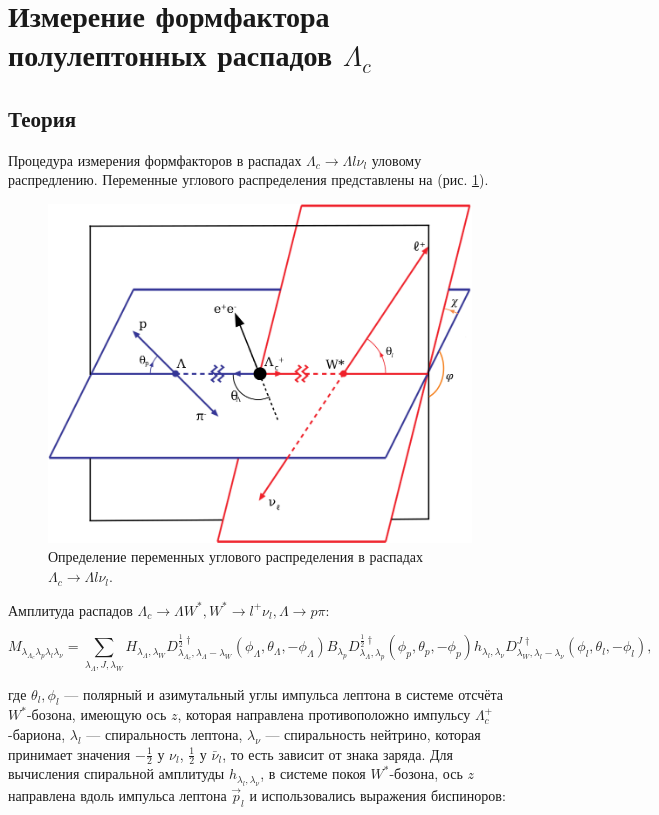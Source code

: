 \section{Измерение формфактора полулептонных распадов $\Lambda_c$}

\subsection{Теория}

Процедура измерения формфакторов в распадах $\Lambda_c \to \Lambda l \nu_l$
уловому распредлению. Переменные углового распределения представлены 
на (рис. \ref{lc_l_l_nu:def}). 

\begin{figure}[H]
    \centering
    \includegraphics[width=0.7\linewidth]{img/lc_l_l_nu_def.png}
    \caption{Определение переменных углового распределения в распадах  $\Lambda_c \to \Lambda l \nu_l$.}
    \label{lc_l_l_nu:def}
\end{figure}

Амплитуда распадов 
$\Lambda_c \to \Lambda W^*, W^* \to l^+ \nu_l, \Lambda \to p \pi$:


\begin{equation}
    M_{\lambda_{\Lambda_c}\lambda_{p}\lambda_{l}\lambda_{\nu}} 
    = 
    \sum_{\lambda_{\Lambda},J,\lambda_{W}} H_{\lambda_{\Lambda},\lambda_{W}} D^{\frac{1}{2} \dagger}_{\lambda_{\Lambda_c},\lambda_{\Lambda}-\lambda_{W}}(\phi_{\Lambda}, \theta_{\Lambda}, -\phi_{\Lambda}) B_{\lambda_{p}} D^{\frac{1}{2} \dagger}_{\lambda_{\Lambda},\lambda_{p}}(\phi_{p}, \theta_{p}, -\phi_{p}) h_{\lambda_{l},\lambda_{\nu}} D^{J \dagger}_{\lambda_{W},\lambda_{l}-\lambda_{\nu}}(\phi_{l}, \theta_{l}, -\phi_{l}),
\end{equation}


где $\theta_l, \phi_l$ --- полярный и азимутальный углы импульса лептона 
в системе отсчёта  $W^*$-бозона, имеющую ось $z$, которая направлена 
противоположно импульсу $\Lambda^+_c $-бариона, 
$\lambda_l$ --- спиральность лептона, 
$\lambda_\nu$ --- спиральность нейтрино, 
которая принимает значения $-\frac{1}{2}$ у $\nu_l$, $\frac{1}{2}$ у $\bar \nu_l$, 
то есть зависит от знака заряда. 
Для вычисления спиральной амплитуды $h_{\lambda_l, \lambda_\nu}$, 
в системе покоя $W^*$-бозона, ось $z$ направлена вдоль импульса лептона 
$\vec{p}_l$ и использовались выражения биспиноров:

